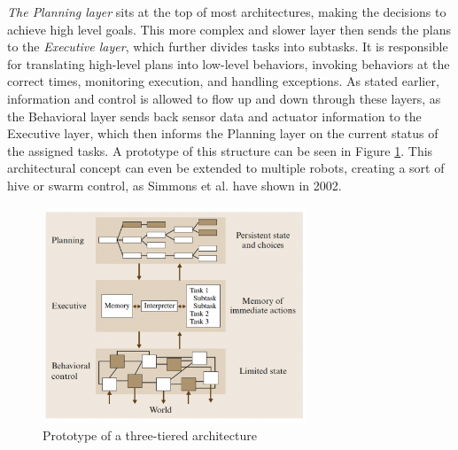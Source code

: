\documentclass[%
paper=A4,               %
twoside=true,           %
openright,              %
11pt,                   %
bibliography=totoc,     %
titlepage=on,           %
DIV=12,                 %
BCOR=1.5cm,             %
parskip=half,            %
final
]{scrreprt}
\begin{document}
	\textit{The Planning layer} sits at the top of most architectures, making the decisions to achieve high level goals. This more complex and slower layer then sends the plans to the \textit{Executive layer}, which further divides tasks into subtasks. It is responsible for translating high-level plans into low-level behaviors, invoking behaviors at the correct times, monitoring execution, and handling exceptions. \autocite{schillingAutonomeSystemeUnd2023,simmonsLayeredArchitectureCoordination2002,volpeCLARAtyArchitectureRobotic2001} 
	As stated earlier, information and control is allowed to flow up and down through these layers, as the Behavioral layer sends back sensor data and actuator  information to the Executive layer, which then informs the Planning layer on the current status of the assigned tasks. \autocite{jun-youngjungThreelayeredHybridArchitecture2008} A prototype of this structure can be seen in Figure \ref{fig: fig3}. 
	This architectural concept can even be extended to multiple robots, creating a sort of hive or swarm control, as Simmons et al. have shown in 2002. \autocite{simmonsLayeredArchitectureCoordination2002}
	
	\begin{figure}[ht]
		\centering
		\includegraphics[width=0.7\textwidth]{Graphics/three-layered-Architecture}
		\caption{Prototype of a three-tiered architecture \autocite{sicilianoSpringerHandbookRobotics2016}}
		\label{fig: fig3}
	\end{figure}
	\newpage
	
\end{document}
